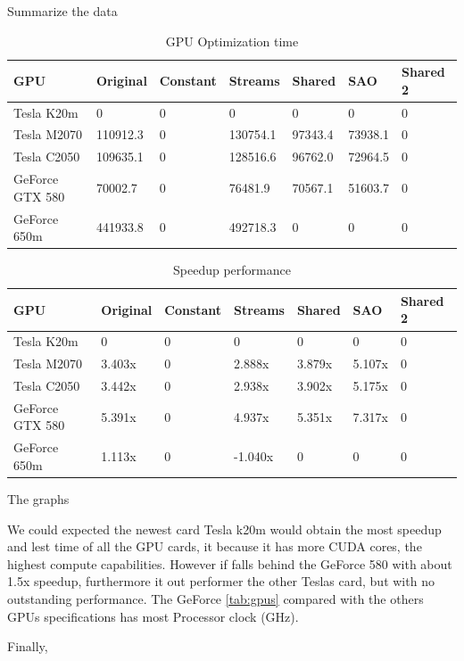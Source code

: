 Summarize the data

\begin{table}[h]
\centering
  \begin{tabular} { |  l  |  l | l  |  l  | l | l | l |}
    \hline
    GPU & Original & Constant & Streams & Shared & SAO & Shared 2 \\
    \hline
    Tesla K20m & 0 & 0 & 0 & 0 & 0 & 0\\
   \hline
    Tesla M2070 & 110912.3 & 0 & 130754.1 & 97343.4 & 73938.1 & 0\\
    \hline
    Tesla C2050 & 109635.1 & 0 & 128516.6 & 96762.0 & 72964.5 & 0\\
   \hline
    GeForce GTX 580 & 70002.7 & 0 & 76481.9 & 70567.1 & 51603.7 & 0\\
   \hline
    GeForce 650m & 441933.8 & 0 & 492718.3 & 0 & 0 & 0\\
   \hline
  \end{tabular}
    \caption{GPU Optimization time}
  \label{tab:time}
  \end{table}
  
  \begin{table}[h]
\centering
  \begin{tabular} { |  l  |  l | l  |  l  | l | l | l |}
    \hline
    GPU & Original & Constant & Streams & Shared & SAO & Shared 2 \\
    \hline
    Tesla K20m & 0 & 0 & 0 & 0 & 0 & 0\\
   \hline
    Tesla M2070 & 3.403x & 0 & 2.888x & 3.879x & 5.107x & 0\\
    \hline
    Tesla C2050 & 3.442x & 0 & 2.938x & 3.902x & 5.175x & 0\\
   \hline
    GeForce GTX 580 & 5.391x & 0 & 4.937x & 5.351x & 7.317x & 0\\
   \hline
    GeForce 650m & 1.113x & 0 & -1.040x & 0 & 0 & 0\\
   \hline
  \end{tabular}
    \caption{Speedup performance}
  \label{tab:speed}
  \end{table}
  
  The graphs 
  
  
We could expected the newest card Tesla k20m would obtain the most speedup and lest time of all the GPU cards, it  because it has more CUDA cores, the highest compute capabilities. However if falls behind the GeForce 580 with about 1.5x speedup, furthermore it out performer the other Teslas card, but with no outstanding performance. The GeForce \ref{tab:gpus} compared with the others GPUs specifications has most Processor clock (GHz).
  

  \vspace{3.5em}

Finally, 
  
